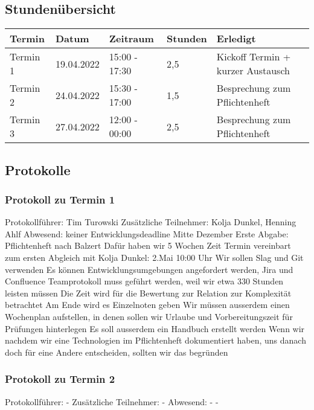 \subsection{Stundenübersicht}

\begin{tabular}{|l|l|l|l|l|}
\hline
Termin & Datum & Zeitraum & Stunden & Erledigt \\
\hline
    Termin 1 & 19.04.2022 & 15:00 - 17:30 & 2,5 & Kickoff Termin + kurzer Austausch \\
	Termin 2 & 24.04.2022 & 15:30 - 17:00 & 1,5 & Besprechung zum Pflichtenheft \\
	Termin 3 & 27.04.2022 & 12:00 - 00:00 & 2,5 & Besprechung zum Pflichtenheft \\
\hline
\end{tabular}

\subsection{Protokolle}
\subsubsection{Protokoll zu Termin 1}
Protokollführer: Tim Turowski \newline
Zusätzliche Teilnehmer: Kolja Dunkel, Henning Ahlf \newline
Abwesend: keiner \newline \newline
Entwicklungsdeadline Mitte Dezember \newline
Erste Abgabe: Pflichtenheft nach Balzert \newline
Dafür haben wir 5 Wochen Zeit \newline
Termin vereinbart zum ersten Abgleich mit Kolja Dunkel: 2.Mai 10:00 Uhr \newline
Wir sollen Slag und Git verwenden \newline
Es können Entwicklungsumgebungen angefordert werden, Jira und Confluence \newline
Teamprotokoll muss geführt werden, weil wir etwa 330 Stunden leisten müssen \newline
Die Zeit wird für die Bewertung zur Relation zur Komplexität betrachtet \newline
Am Ende wird es Einzelnoten geben \newline
Wir müssen ausserdem einen Wochenplan aufstellen, in denen sollen wir Urlaube und Vorbereitungszeit für Prüfungen hinterlegen \newline
Es soll ausserdem ein Handbuch erstellt werden \newline
Wenn wir nachdem wir eine Technologien im Pflichtenheft dokumentiert haben, uns danach doch für eine Andere entscheiden, sollten wir das begründen 

\subsubsection{Protokoll zu Termin 2}
Protokollführer: - \newline
Zusätzliche Teilnehmer: - \newline
Abwesend: - \newline
-
